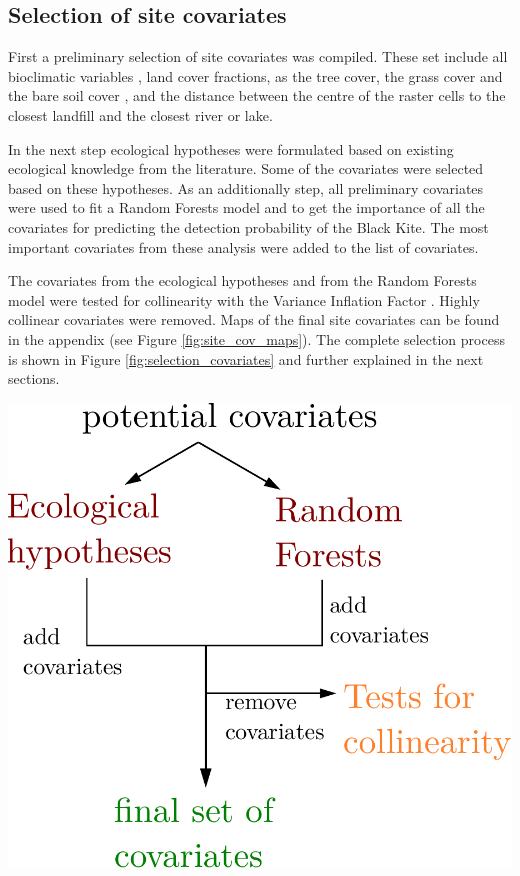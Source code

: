 \begin{multicols}{2}
\subsection*{Selection of site covariates}

First a preliminary selection of site covariates was compiled. These set include all bioclimatic variables \parencite{Fick2017}, land cover fractions, as the tree cover, the grass cover and the bare soil cover \parencite{land_cover_data}, and the distance between the centre of the raster cells to the closest landfill and the closest river or lake. 

In the next step ecological hypotheses were formulated based on existing ecological knowledge from the literature. Some of the covariates were selected based on these hypotheses. As an additionally step, all preliminary covariates were used to fit a Random Forests model and to get the importance of all the covariates for predicting the detection probability of the Black Kite. The most important covariates from these analysis were added to the list of covariates. 

The covariates from the ecological hypotheses and from the Random Forests model were tested for collinearity with the Variance Inflation Factor \parencite[as implemented in][]{Heiberger2020}. Highly collinear covariates were removed. Maps of the final site covariates can be found in the appendix (see Figure \ref{fig:site_cov_maps}). The complete selection process is shown in Figure \ref{fig:selection_covariates} and further explained in the next sections.  


\begin{minipage}{\linewidth}
	\vspace{1cm}
	\centering
	\includegraphics[width=0.9\linewidth]{img/selection_of_cov}
	\label{fig:selection_covariates}
\end{minipage}


\end{multicols}

